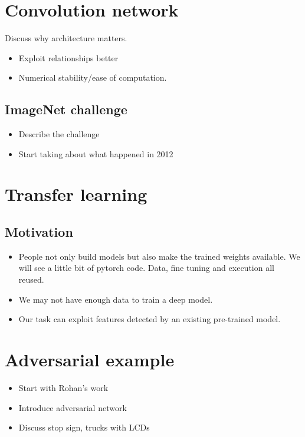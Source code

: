 \documentclass[14pt, twocolumn]{article}
\begin{document}
\section*{Convolution network}
Discuss why architecture matters.
\begin{itemize}
	\item Exploit relationships better 
	\item Numerical stability/ease of computation.
\end{itemize}

\subsection*{ImageNet challenge}
\begin{itemize}
	\item Describe the challenge 
	\item Start taking about what happened in 2012 
\end{itemize}


\section*{Transfer learning}
\subsection*{Motivation}
\begin{itemize}
	\item People not only build models but also make the trained weights available. 
	We will see a little bit of pytorch code. Data, fine tuning and execution all 
	reused. 
	\item We may not have enough data to train a deep model. 
	\item Our task can exploit features detected by an existing pre-trained model. 
\end{itemize}

\section*{Adversarial example}
\begin{itemize}
	\item Start with Rohan's work 
	\item Introduce adversarial network 
	\item Discuss stop sign, trucks with LCDs 
\end{itemize}

\nocite{dumoulin2018guide}
\nocite{726791}
\nocite{43405}
\nocite{45818}
\nocite{10.5555/3086952}
\nocite{NIPS2014_5346}
\nocite{russell2016artificial}
 

\end{document}
